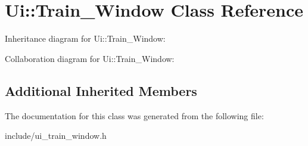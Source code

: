 \hypertarget{classUi_1_1Train__Window}{}\section{Ui\+:\+:Train\+\_\+\+Window Class Reference}
\label{classUi_1_1Train__Window}


Inheritance diagram for Ui\+:\+:Train\+\_\+\+Window\+:


Collaboration diagram for Ui\+:\+:Train\+\_\+\+Window\+:
\subsection*{Additional Inherited Members}


The documentation for this class was generated from the following file\+:\begin{DoxyCompactItemize}
\item 
include/ui\+\_\+train\+\_\+window.\+h\end{DoxyCompactItemize}
